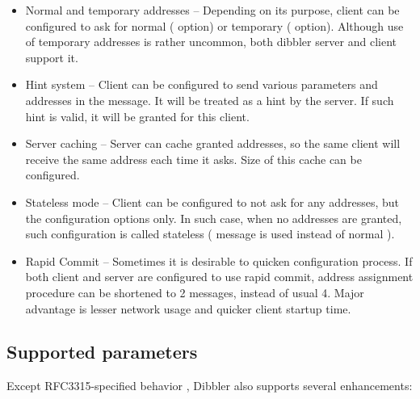 \begin{itemize}
      circumstances, client uses  message, to config if
      those addresses are still valid. \footnote{As for \version
      version, this functionality works on the server side only,
      client side support will be available in future releases.}.
\item Normal and temporary addresses -- Depending on its purpose,
      client can be configured to ask for normal ( option)
      or temporary ( option). Although use of temporary
      addresses is rather uncommon, both dibbler server and client
      support it.
\item Hint system -- Client can be configured to send various parameters
      and addresses in the  message. It will be treated as
      a hint by the server. If such hint is valid, it will be granted
      for this client.
\item Server caching -- Server can cache granted addresses, so the same
      client will receive the same address each time it asks. Size of
      this cache can be configured.
\item Stateless mode -- Client can be configured to not ask for any
      addresses, but the configuration options only. In such case, when
      no addresses are granted, such configuration is called stateless
      ( message is used instead of normal
      ).
\item Rapid Commit -- Sometimes it is desirable to quicken configuration
      process. If both client and server are configured to use rapid
      commit, address assignment procedure can be shortened to 2
      messages, instead of usual 4. Major advantage is lesser network
      usage and quicker client startup time.
\end{itemize}

\subsection{Supported parameters}
Except RFC3315-specified behavior \cite{rfc3315}, Dibbler also supports
several enhancements:

